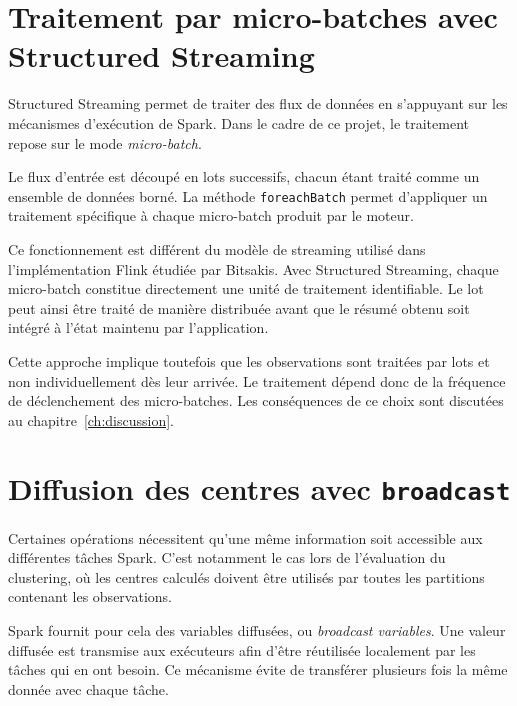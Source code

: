 \section{Traitement par micro-batches avec Structured Streaming}

Structured Streaming permet de traiter des flux de données en s'appuyant sur les mécanismes d'exécution de Spark. Dans le cadre de ce projet, le traitement repose sur le mode \emph{micro-batch}.

Le flux d'entrée est découpé en lots successifs, chacun étant traité comme un ensemble de données borné. La méthode \texttt{foreachBatch} permet d'appliquer un traitement spécifique à chaque micro-batch produit par le moteur.

Ce fonctionnement est différent du modèle de streaming utilisé dans l'implémentation Flink étudiée par Bitsakis. Avec Structured Streaming, chaque micro-batch constitue directement une unité de traitement identifiable. Le lot peut ainsi être traité de manière distribuée avant que le résumé obtenu soit intégré à l'état maintenu par l'application.

Cette approche implique toutefois que les observations sont traitées par lots et non individuellement dès leur arrivée. Le traitement dépend donc de la fréquence de déclenchement des micro-batches. Les conséquences de ce choix sont discutées au chapitre~\ref{ch:discussion}.

\section{Diffusion des centres avec \texttt{broadcast}}

Certaines opérations nécessitent qu'une même information soit accessible aux différentes tâches Spark. C'est notamment le cas lors de l'évaluation du clustering, où les centres calculés doivent être utilisés par toutes les partitions contenant les observations.

Spark fournit pour cela des variables diffusées, ou \emph{broadcast variables}. Une valeur diffusée est transmise aux exécuteurs afin d'être réutilisée localement par les tâches qui en ont besoin. Ce mécanisme évite de transférer plusieurs fois la même donnée avec chaque tâche.

